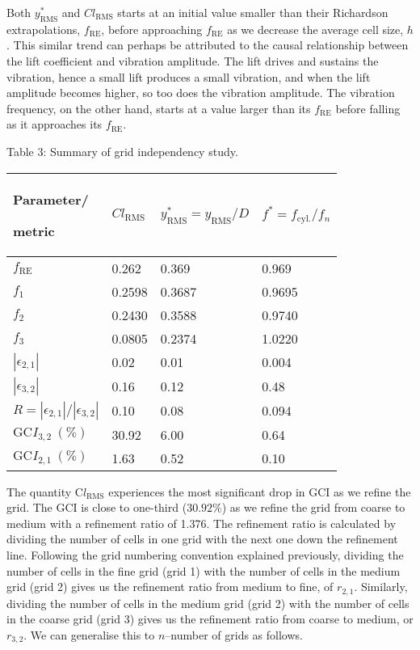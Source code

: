 \documentclass[]{article}
\begin{document}
Both \(y_{\text{RMS}}^{*}\) and \(Cl_{\text{RMS}}\) starts at an initial
value smaller than their Richardson extrapolations, \(f_{\text{RE}}\),
before approaching \(f_{\text{RE}}\) as we decrease the average cell
size, \(h\). This similar trend can perhaps be attributed to the causal
relationship between the lift coefficient and vibration amplitude. The
lift drives and sustains the vibration, hence a small lift produces a
small vibration, and when the lift amplitude becomes higher, so too does
the vibration amplitude. The vibration frequency, on the other hand,
starts at a value larger than its \(f_{\text{RE}}\) before falling as it
approaches its \(f_{\text{RE}}\).

\protect\hypertarget{_Ref40997535}{}{}Table 3: Summary of grid
independency study.

\begin{longtable}[]{@{}llll@{}}
\toprule
Parameter/

metric & \(Cl_{\text{RMS}}\) & \(y_{\text{RMS}}^{*} = y_{\text{RMS}}/D\)
& \(f^{*} = f_{\text{cyl.}}/f_{n}\)\tabularnewline
\midrule
\endhead
\(f_{\text{RE}}\) & 0.262 & 0.369 & 0.969\tabularnewline
\(f_{1}\) & 0.2598 & 0.3687 & 0.9695\tabularnewline
\(f_{2}\) & 0.2430 & 0.3588 & 0.9740\tabularnewline
\(f_{3}\) & 0.0805 & 0.2374 & 1.0220\tabularnewline
\(\left| \epsilon_{2,1} \right|\) & 0.02 & 0.01 & 0.004\tabularnewline
\(\left| \epsilon_{3,2} \right|\) & 0.16 & 0.12 & 0.48\tabularnewline
\(R = \left| \epsilon_{2,1} \right|/\left| \epsilon_{3,2} \right|\) &
0.10 & 0.08 & 0.094\tabularnewline
\(\text{GC}I_{3,2}\ (\%)\) & 30.92 & 6.00 & 0.64\tabularnewline
\(\text{GC}I_{2,1}\ (\%)\) & 1.63 & 0.52 & 0.10\tabularnewline
\bottomrule
\end{longtable}

The quantity C\(l_{\text{RMS}}\) experiences the most significant drop
in GCI as we refine the grid. The GCI is close to one-third
(\(30.92\%\)) as we refine the grid from coarse to medium with a
refinement ratio of 1.376. The refinement ratio is calculated by
dividing the number of cells in one grid with the next one down the
refinement line. Following the grid numbering convention explained
previously, dividing the number of cells in the fine grid (grid 1) with
the number of cells in the medium grid (grid 2) gives us the refinement
ratio from medium to fine, of \(r_{2,1}\). Similarly, dividing the
number of cells in the medium grid (grid 2) with the number of cells in
the coarse grid (grid 3) gives us the refinement ratio from coarse to
medium, or \(r_{3,2}\). We can generalise this to \(n\)--number of grids
as follows.
\end{document}
